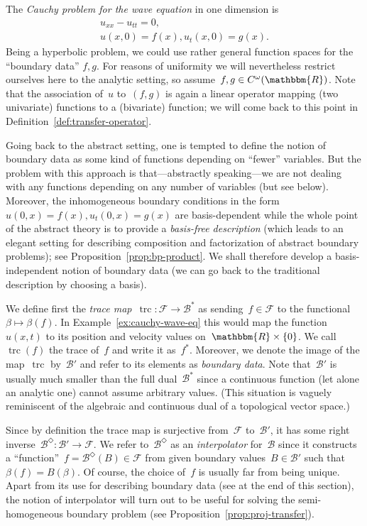 \documentclass[a4paper]{llncs}
\let\mathbb\mathbbm
\newcommand{\RR}{\mathbb{R}}
\newcommand{\fri}[1]{#1^\Diamond}
\newcommand{\trc}{\operatorname{trc}}
\newcommand{\galg}{\mathcal{F}}
\newcommand{\bspc}{\mathcal{B}}
\newcommand{\bvp}[2]{\boxed{\begin{array}{l}#1\\#2\end{array}}}
\begin{document}
\begin{myexample}
  \label{ex:cauchy-wave-eq}
  The \emph{Cauchy problem for the wave equation} in one dimension is
\begin{equation*}
    \bvp{u_{xx} - u_{tt} = 0,}{u(x,0) = f(x), u_t(x,0) = g(x).}
  \end{equation*}
Being a hyperbolic problem, we could use rather general function spaces for
  the ``boundary data'' $f,g$. For reasons of uniformity we will nevertheless
  restrict ourselves here to the analytic setting, so assume~$f,g \in
  C^\omega(\RR)$. Note that the association of~$u$ to~$(f,g)$ is again a linear
  operator mapping (two univariate) functions to a (bivariate) function; we will
  come back to this point in Definition~\ref{def:transfer-operator}.
\end{myexample}

Going back to the abstract setting, one is tempted to define the notion of
boundary data as some kind of functions depending on ``fewer'' variables. But
the problem with this approach is that---abstractly speaking---we are not
dealing with any functions depending on any number of variables (but see
below). Moreover, the inhomogeneous boundary conditions in the
form~$u(0,x)=f(x), u_t(0,x)=g(x)$ are basis-dependent while the whole point of
the abstract theory is to provide a \emph{basis-free description} (which leads
to an elegant setting for describing composition and factorization of abstract
boundary problems); see Proposition~\ref{prop:bp-product}. We shall therefore
develop a basis-independent notion of boundary data (we can go back to the
traditional description by choosing a basis).

We define first the \emph{trace map}~$\trc\colon \galg \to \bspc^*$ as
sending~$f \in \galg$ to the functional~$\beta \mapsto \beta(f)$. In
Example~\ref{ex:cauchy-wave-eq} this would map the function~$u(x,t)$ to its
position and velocity values on~$\RR \times \{0\}$. We call~$\trc(f)$ the trace
of~$f$ and write it as~$f^*$. Moreover, we denote the image of the map~$\trc$
by~$\bspc'$ and refer to its elements as \emph{boundary data}. Note
that~$\bspc'$ is usually much smaller than the full dual~$\bspc^*$ since a
continuous function (let alone an analytic one) cannot assume arbitrary
values. (This situation is vaguely reminiscent of the algebraic and continuous
dual of a topological vector space.)

Since by definition the trace map is surjective from~$\galg$ to~$\bspc'$, it has
some right inverse~$\fri{\bspc}\colon \bspc' \to \galg$. We refer
to~$\fri{\bspc}$ as an \emph{interpolator} for~$\bspc$ since it constructs a
``function''~$f = \fri{\bspc}(B) \in \galg$ from given boundary values~$B \in
\bspc'$ such that~$\beta(f) = B(\beta)$. Of course, the choice of~$f$ is usually
far from being unique. Apart from its use for describing boundary data (see at
the end of this section), the notion of interpolator will turn out to be useful
for solving the semi-homogeneous boundary problem (see
Proposition~\ref{prop:proj-transfer}).
\end{document}
